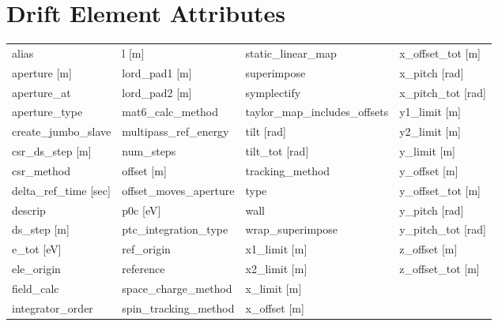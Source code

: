  \section{Drift Element Attributes}
 \label{s:list.drift}
 
 \begin{tabular}{llll} \toprule
alias                            & l [m]                            & static_linear_map                & x_offset_tot [m]                 \\
aperture [m]                     & lord_pad1 [m]                    & superimpose                      & x_pitch [rad]                    \\
aperture_at                      & lord_pad2 [m]                    & symplectify                      & x_pitch_tot [rad]                \\
aperture_type                    & mat6_calc_method                 & taylor_map_includes_offsets      & y1_limit [m]                     \\
create_jumbo_slave               & multipass_ref_energy             & tilt [rad]                       & y2_limit [m]                     \\
csr_ds_step [m]                  & num_steps                        & tilt_tot [rad]                   & y_limit [m]                      \\
csr_method                       & offset [m]                       & tracking_method                  & y_offset [m]                     \\
delta_ref_time [sec]             & offset_moves_aperture            & type                             & y_offset_tot [m]                 \\
descrip                          & p0c [eV]                         & wall                             & y_pitch [rad]                    \\
ds_step [m]                      & ptc_integration_type             & wrap_superimpose                 & y_pitch_tot [rad]                \\
e_tot [eV]                       & ref_origin                       & x1_limit [m]                     & z_offset [m]                     \\
ele_origin                       & reference                        & x2_limit [m]                     & z_offset_tot [m]                 \\
field_calc                       & space_charge_method              & x_limit [m]                      &                                  \\
integrator_order                 & spin_tracking_method             & x_offset [m]                     &                                  \\
 \bottomrule
 \end{tabular}
 \vfill
 
